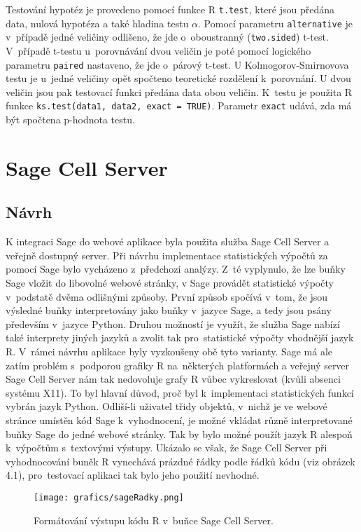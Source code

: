 \documentclass[thesis=B,czech]{FITthesis}[2012/06/26]
\begin{document}
Testování hypotéz je provedeno pomocí funkce R \texttt{t.test}, které jsou předána data, nulová hypotéza a také hladina testu $\alpha$. Pomocí parametru \texttt{alternative} je v~případě jedné veličiny odlišeno, že jde o~oboustranný (\texttt{two.sided}) t-test. V~případě t-testu u~porovnávání dvou veličin je poté pomocí logického parametru \texttt{paired} nastaveno, že jde o~párový t-test. U Kolmogorov-Smirnovova testu je u~jedné veličiny opět spočteno teoretické rozdělení k~porovnání. U dvou veličin jsou pak testovací funkci předána data obou veličin. K~testu je použita R funkce \texttt{ks.test(data1, data2, exact = TRUE)}. Parametr \texttt{exact} udává, zda má být spočtena p-hodnota testu.  


\section{Sage Cell Server}
\subsection{Návrh}
K integraci Sage do webové aplikace byla použita služba Sage Cell Server a veřejně dostupný server. Při návrhu implementace statistických výpočtů za pomocí Sage bylo vycházeno z~předchozí analýzy. Z~té vyplynulo, že lze buňky Sage vložit do libovolné webové stránky,
v Sage provádět statistické výpočty v~podstatě dvěma odlišnými způsoby. První způsob spočívá v~tom, že jsou výsledné buňky interpretovány jako buňky v~jazyce Sage, a tedy jsou psány především v~jazyce Python. Druhou možností je využít, že služba Sage nabízí také interprety jiných jazyků a zvolit tak pro~statistické výpočty vhodnější jazyk R. V~rámci návrhu aplikace byly vyzkoušeny obě tyto varianty. Sage má ale zatím problém s~podporou grafiky R na~některých platformách a veřejný server Sage Cell Server nám tak nedovoluje grafy R vůbec vykreslovat (kvůli absenci systému X11). To byl hlavní důvod, proč byl k~implementaci statistických funkcí vybrán jazyk Python. Odliší-li uživatel třidy objektů, v~nichž je ve webové stránce umístěn kód Sage k~vyhodnocení, je možné vkládat různě interpretované buňky Sage do jedné webové stránky. Tak by bylo možné použít jazyk R alespoň k~výpočtům s~textovými výstupy. Ukázalo se však, že Sage Cell Server při vyhodnocování buněk R vynechává prázdné řádky podle řádků kódu (viz obrázek 4.1), pro~testovací aplikaci tak bylo jeho použití nevhodné. 

\begin{figure}[ht]
    \centering
    \texttt{[image: grafics/sageRadky.png]}
    \caption{Formátování výstupu kódu R v~buňce Sage Cell Server.}
\end{figure}
\end{document}
